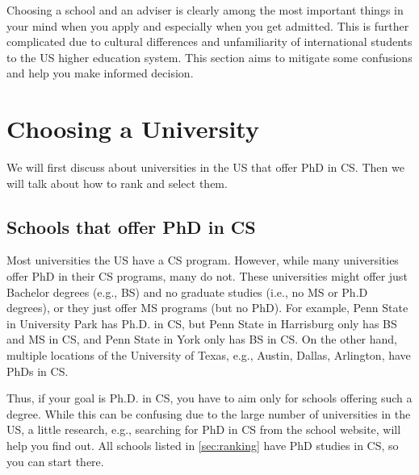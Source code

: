 \documentclass[oneside,11pt]{memoir}
\begin{document}
Choosing a school and an adviser is clearly among the most important things in your mind when you apply and especially when you get admitted.  This is further complicated due to cultural differences and unfamiliarity of  international students to the US higher education system.  This section aims to mitigate some confusions and help you make informed decision.

\section{Choosing a University}

We will first discuss about universities in the US that offer PhD in CS. Then we will talk about how to rank and select them.

\subsection{Schools that offer PhD in CS}  

Most universities the US have a CS program.
However, while many universities offer PhD in their CS programs, many do not.  These universities might offer just Bachelor degrees (e.g., BS) and no graduate studies (i.e., no MS or Ph.D degrees), or they just offer MS programs (but no PhD). For example, Penn State in University Park has Ph.D. in CS,  but Penn State in Harrisburg only has BS and MS in CS, and Penn State in York only has BS in CS.  On the other hand, multiple locations of the University of Texas, e.g., Austin, Dallas, Arlington, have PhDs in CS. 

Thus, if your goal is Ph.D. in CS, you have to aim only for schools offering such a degree.  %
While this can be confusing due to the large number of universities in the US, a little research, e.g., searching for PhD in CS from the school website, will help you find out. All schools listed in \autoref{sec:ranking} have PhD studies in CS, so you can start there.

\end{document}
